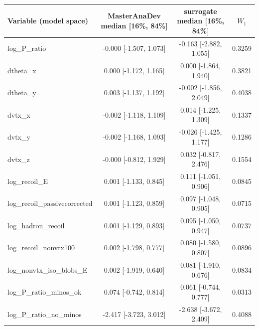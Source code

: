 \begin{tabular}{lccc}
\toprule
Variable (model space) & MasterAnaDev median [16\%, 84\%] & surrogate median [16\%, 84\%] & $W_1$ \\
\midrule
log\_P\_ratio & -0.000 [-1.507, 1.073] & -0.163 [-2.882, 1.055] & 0.3259 \\
dtheta\_x & 0.000 [-1.172, 1.165] & 0.000 [-1.864, 1.940] & 0.3821 \\
dtheta\_y & 0.003 [-1.137, 1.192] & -0.002 [-1.856, 2.049] & 0.4038 \\
dvtx\_x & -0.002 [-1.118, 1.109] & 0.014 [-1.225, 1.309] & 0.1337 \\
dvtx\_y & -0.002 [-1.168, 1.093] & -0.026 [-1.425, 1.177] & 0.1286 \\
dvtx\_z & -0.000 [-0.812, 1.929] & 0.032 [-0.817, 2.476] & 0.1554 \\
log\_recoil\_E & 0.001 [-1.133, 0.845] & 0.111 [-1.051, 0.906] & 0.0845 \\
log\_recoil\_passivecorrected & 0.001 [-1.123, 0.859] & 0.097 [-1.048, 0.905] & 0.0715 \\
log\_hadron\_recoil & 0.001 [-1.129, 0.893] & 0.095 [-1.050, 0.947] & 0.0737 \\
log\_recoil\_nonvtx100 & 0.002 [-1.798, 0.777] & 0.080 [-1.580, 0.807] & 0.0896 \\
log\_nonvtx\_iso\_blobs\_E & 0.002 [-1.919, 0.640] & 0.081 [-1.910, 0.676] & 0.0834 \\
log\_P\_ratio\_minos\_ok & 0.074 [-0.742, 0.814] & 0.061 [-0.744, 0.777] & 0.0313 \\
log\_P\_ratio\_no\_minos & -2.417 [-3.723, 3.012] & -2.638 [-3.672, 2.409] & 0.4088 \\
\bottomrule
\end{tabular}
